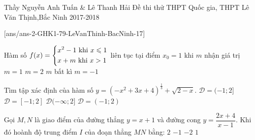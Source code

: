 
\begin{name}
{Thầy Nguyễn Anh Tuấn \&
	Lê Thanh Hải}
{Đề thi thử THPT Quốc gia, THPT Lê Văn Thịnh,Bắc Ninh 2017-2018 }
\end{name}
\setcounter{ex}{0}\setcounter{bt}{0}
[ans/ans-2-GHK1-79-LeVanThinh-BacNinh-17]

\begin{ex}%
	Hàm số $f(x)=\heva{& x^2-1\ \text{khi}\ x\leqslant1 \\& x+m\ \text{khi}\ x>1}$ liên tục tại điểm $x_0 = 1$ khi $m$ nhận giá trị
	\choice
	{$m=1$}
	{$m=2$}
	{$m$ bất kì}
	{\True $m=-1$}
\end{ex}

\begin{ex}%
	Tìm tập xác định của hàm số $y=\left(-x^2+3x+4 \right)^{\frac{1}{3}}+\sqrt{2-x}$.
	\choice
	{\True$\mathscr{D}=(-1;2]$}
	{$\mathscr{D}=[-1;2]$}
	{ $\mathscr{D}(-\infty;2]$}
	{ $\mathscr{D}=(-1;2)$}
\end{ex}

\begin{ex}%
	Gọi $M,N$ là giao điểm của đường thẳng $y=x+1$ và đường cong $y=\dfrac{2x+4}{x-1}$. Khi đó hoành độ trung điểm $I$ của đoạn thẳng $MN$ bằng:
	\choice
	{$2$}
	{$-1$}
	{$-2$}
	{\True $1$}
\end{ex}

